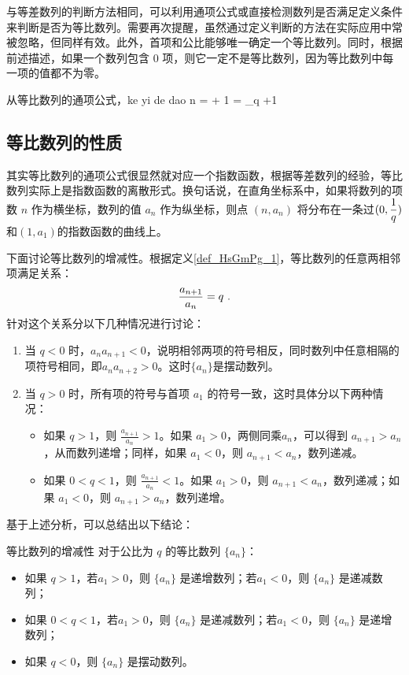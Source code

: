 与等差数列的判断方法相同，可以利用通项公式或直接检测数列是否满足定义条件来判断是否为等比数列。需要再次提醒，虽然通过定义判断的方法在实际应用中常被忽略，但同样有效。此外，首项和公比能够唯一确定一个等比数列。同时，根据前述描述，如果一个数列包含 $0$ 项，则它一定不是等比数列，因为等比数列中每一项的值都不为零。

从等比数列的通项公式，ke yi de dao
n =  + 1 = \log_q +1~

\subsection{等比数列的性质}

其实等比数列的通项公式很显然就对应一个指数函数，根据等差数列的经验，等比数列实际上是指数函数的离散形式。换句话说，在直角坐标系中，如果将数列的项数 $n$ 作为横坐标，数列的值 $a_n$ 作为纵坐标，则点 $(n, a_n)$ 将分布在一条过$\displaystyle(0,{1\over q})$和$(1,a_1)$的指数函数的曲线上。

下面讨论等比数列的增减性。根据定义\autoref{def_HsGmPg_1}，等比数列的任意两相邻项满足关系：
\begin{equation}
{a_{n+1}\over a_n}=q~.
\end{equation}
针对这个关系分以下几种情况进行讨论：
\begin{enumerate}
\item 当 $q < 0$ 时，$a_n a_{n+1} < 0$，说明相邻两项的符号相反，同时数列中任意相隔的项符号相同，即$a_na_{n+2}>0$。这时$\{a_n\}$是摆动数列。
\item 当 $q > 0$ 时，所有项的符号与首项 $a_1$ 的符号一致，这时具体分以下两种情况：
\begin{itemize}
\item 如果 $q > 1$，则 $\displaystyle\frac{a_{n+1}}{a_n} > 1$。如果 $a_1 > 0$，两侧同乘$a_n$，可以得到 $a_{n+1} > a_n$，从而数列递增；同样，如果 $a_1 < 0$，则 $a_{n+1} < a_n$，数列递减。
\item 如果 $0 < q < 1$，则 $\displaystyle\frac{a_{n+1}}{a_n} < 1$。如果 $a_1 > 0$，则 $a_{n+1} < a_n$，数列递减；如果 $a_1 < 0$，则 $a_{n+1} > a_n$，数列递增。
\end{itemize}	
\end{enumerate}

基于上述分析，可以总结出以下结论：
\begin{corollary}{等比数列的增减性}
对于公比为 $q$ 的等比数列 $\{a_n\}$：
\begin{itemize}
\item 如果 $q > 1$，若$a_1>0$，则 $\{a_n\}$ 是递增数列；若$a_1<0$，则 $\{a_n\}$ 是递减数列；
\item 如果 $0< q < 1$，若$a_1>0$，则 $\{a_n\}$ 是递减数列；若$a_1<0$，则 $\{a_n\}$ 是递增数列；
\item 如果 $q<0$，则 $\{a_n\}$ 是摆动数列。
\end{itemize}
\end{corollary}


